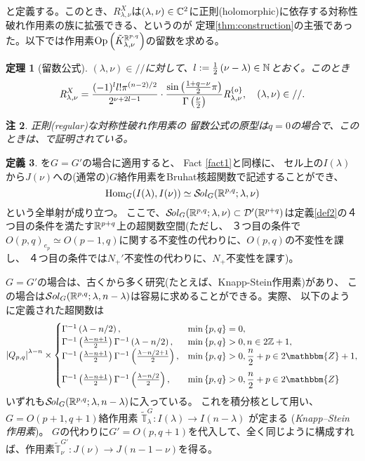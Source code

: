 \documentclass[12pt]{article} %
\newcommand{\Hom}{\mbox{\normalfont Hom}}
\newcommand{\Sol}{\mathcal{S}\!{\it ol}}
\newtheorem{theorem}{定理}
\newtheorem{remark}[theorem]{注}
\theoremstyle{definition}
\newtheorem{definition}[theorem]{定義}
\theoremstyle{exampstyle} \newtheorem{examp}[theorem]{Theorem}
\newcommand{\Op}{\mbox{\normalfont Op}}
\newcommand{\OpR}{\mbox{\it R}}
\renewcommand{\Q}{Q_{p,q}}
\newcommand{\doubt}[1]{{#1}}
\begin{document}
と定義する。このとき、$R_{\lambda,\nu}^X$は$(\lambda,\nu)\in\mathbb{C}^2$に正則(holomorphic)に依存する対称性破れ作用素の族に拡張できる{、}というのが
定理\ref{thm:construction}の主張であった。以下では作用素$\Op\left( \tilde{K}^{\R^{p,q}}_{\lambda,\nu} \right)$の留数を求める。
\begin{theorem}[留数公式]
	$(\lambda,\nu)\in//$に対して、$l:=\frac{1}{2}\left( \nu-\lambda \right)\in\mathbb{N}$とおく。このとき
  \[\OpR_{\lambda,\nu}^X  = \frac{ (- 1)^l l!\pi^{(n - 2) / 2} 
		}{2^{ \nu + 2 l-1}}\cdot  \frac{\sin\left( \frac{1+q-\nu}{2}\pi \right)}{\Gamma\left( \frac{\nu}{2} \right)}
     \OpR_{\lambda,\nu}^{ \left\{ o \right\} },\quad(\lambda,\nu)\in// . \]
	\end{theorem}
	\begin{remark}
		正則(regular)な対称性破れ作用素の
		留数公式の原型は$q=0$の場合で、このときは\cite{KOBAYASHI2014272}、\cite[Thm. 12.2]{kobayashi2015symmetry}で証明されている。
	\end{remark}
	\begin{definition}
		\cite[Thm. 3.16]{kobayashi2015symmetry}を$G=G'$の場合に適用すると\doubt{、}
		Fact \ref{fact1}と同様に、
		セル上の$I(\lambda)$から$J(\nu)$への(通常の)$G$絡作用素をBruhat核超関数で記述することができ、
		\begin{equation*}
		\Hom_G(I(\lambda),I(\nu))\simeq\Sol_G(\R^{p,q};\lambda,\nu)
		\end{equation*}
		という全単射が成り立つ。
		ここで、\;$\Sol_G(\R^{p,q};\lambda,\nu)\subset\mathcal{D}'(\R^{p+q})$は定義\ref{def2}の４つ目の条件を満たす$\mathbb{R}^{p+q}$上の超関数空間(ただし、
		３つ目の条件で$O(p,q)_{e_p}\simeq O(p-1,q)${に関する}不変性の代わりに、$O(p,q)$の不変性を課し、
		４つ目の条件では$N_+'$不変性の代わりに、$N_+$不変性を課す)。

		$G=G'$の場合は、古くから多く研究(たとえば、Knapp-Stein作用素)があり、
		この場合は$\mathcal{S}ol_G(\mathbb{R}^{p,q};\lambda,n-\lambda)$は容易に求めることができる。実際、
		以下のように定義された超関数は
		\begin{equation*}
			\myabs{\Q}^{\lambda-n}\times\begin{cases}
				\Gamma^{-1}\left( \lambda-n/2 \right),&\min\left\{ p,q \right\}=0,\\
				\Gamma^{-1}\left( \frac{\lambda-n+1}{2} \right)\Gamma^{-1}\left( \lambda-n/2 \right),&\min\left\{ p,q \right\}>0,n\in2\Z+1,\\
  \Gamma^{-1} \left( \frac{\lambda-n + 1}{2} \right) \Gamma ^{-1}\left( \frac{\lambda-n/2+
  1}{2} \right), &\min\left\{ p,q \right\}>0, \frac{n}{2} + p \in 2\mathbbm{Z}+ 1,\\[10pt]
  \Gamma^{-1} \left( \frac{\lambda-n + 1}{2} \right) \Gamma ^{-1}\left( \frac{\lambda-n/2}{2}
  \right), & \min\left\{ p,q \right\}>0,\frac{n}{2} + p \in 2\mathbbm{Z}
			\end{cases}
		\end{equation*}
		いずれも$\Sol_G(\R^{p,q};\lambda,n-\lambda)$に入っている。
		これを積分核として用い、$G=O(p+1,q+1)$絡作用素
		$\tilde{\mathbb{T}}^{G}_{\lambda}:I(\lambda)\to
		I(n-\lambda)$
		が定まる
		(\textit{Knapp--Stein 作用素})。
		$G$の代わりに$G'=O(p,q+1)$を代入して、全く同じように構成すれば、作用素$\tilde{\mathbb{T}}^{G'}_\nu:J(\nu)\to J(n-1-\nu)$を得る。
	\end{definition}
\end{document}
